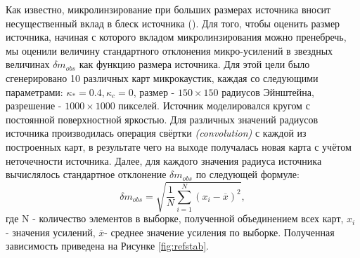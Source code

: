 Как известно, микролинзирование при больших размерах источника вносит несущественный вклад в блеск источника (\cite{schneider1992}). Для того, чтобы оценить размер источника, начиная с которого вкладом микролинзирования можно пренебречь, мы оценили величину стандартного отклонения микро-усилений в звездных величинах $\delta m_{obs}$ как функцию размера источника. 
Для этой цели было сгенерировано 10 различных карт микрокаустик, каждая со следующими параметрами: $\kappa_*=0.4, \kappa_c = 0$, размер - $ 150 \times 150 $ радиусов Эйнштейна, разрешение - $1000 \times 1000$ пикселей. Источник моделировался кругом с постоянной поверхностной яркостью. Для различных значений радиусов источника производилась операция свёртки \textit{(convolution)} с каждой из построенных карт, в результате чего на выходе получалась новая карта с учётом неточечности источника. Далее, для каждого значения радиуса источника вычислялось стандартное отклонение  $\delta m_{o b s}$ по следующей формуле: 
\begin{equation}
\delta m_{o b s}=\sqrt{\frac{1}{N} \sum_{i=1}^{N}\left(x_{i}-\overline{x}\right)^{2}},
\end{equation}
где N - количество элементов в выборке, полученной объединением всех карт, $x_i$ - значения усилений, $\overline x$- среднее значение усиления по выборке. Полученная зависимость приведена на Рисунке \ref{fig:refstab}. 

